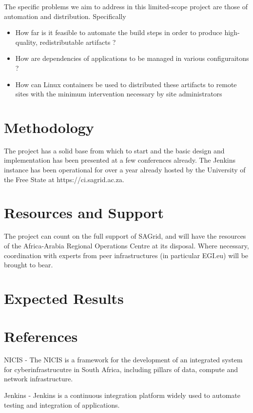 \documentclass[oneside, a4paper, onecolumn, 11pt]{article}
\begin{document}
The specific problems we aim to address in this limited-scope project are those of automation and distribution. Specifically

\begin{itemize}
\item How far is it feasible to automate the build steps in order to produce high-quality, redistributable artifacts ?
\item How are dependencies of applications to be managed in various configuraitons ?
\item How can Linux containers be used to distributed these artifacts to remote sites with the minimum intervention necessary by site administrators
\end{itemize}

\section{Methodology}

The project has a solid base from which to start and the basic design and implementation has been presented at a few conferences already. The Jenkins instance has been operational for over a year already hosted by the University of the Free State at https://ci.sagrid.ac.za. 

\section{Resources and Support}

The project can count on the full support of SAGrid, and will have the resources of the Africa-Arabia Regional Operations Centre at its disposal. Where necessary, coordination with experts from peer infrastructures (in particular EGI.eu) will be brought to bear.

\section{Expected Results}



\section{References}

NICIS - The NICIS is a framework for the development of an integrated system for cyberinfrastrucutre in South Africa, including pillars of data, compute and network infrastructure.

Jenkins - Jenkins is a continuous integration platform widely used to automate testing and integration of applications.




\begin{small}

\end{small}
\end{document}
